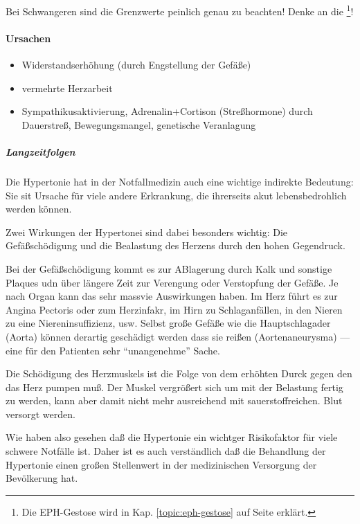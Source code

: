 \begin{gCaveEnv}
    Bei Schwangeren sind die Grenzwerte peinlich genau zu beachten! Denke an
    die \footnote{Die EPH-Gestose wird in
    Kap. \ref{topic:eph-gestose}
    auf Seite \pageref{topic:eph-gestose} erklärt.}!
\end{gCaveEnv}

\paragraph{Ursachen}

\begin{itemize}
    \item Widerstandserh\"ohung (durch Engstellung der Gefä{\ss}e)
    \item vermehrte Herzarbeit
    \item Sympathikusaktivierung, Adrenalin+Cortison (Stre{\ss}hormone) durch
    Dauerstre{\ss},  Bewegungsmangel, genetische Veranlagung  
\end{itemize}

\subparagraph{Langzeitfolgen}

Die Hypertonie hat in der Notfallmedizin auch eine wichtige
indirekte Bedeutung: Sie sit Ursache für viele andere
Erkrankung, die ihrerseits akut lebensbedrohlich werden
können. 

Zwei Wirkungen der Hypertonei sind dabei besonders wichtig:
Die Gefäßschödigung und die Bealastung des Herzens durch
den hohen Gegendruck. 

Bei der Gefäßschödigung kommt es zur ABlagerung durch Kalk
und sonstige Plaques udn über längere Zeit zur Verengung
oder Verstopfung der Gefäße. Je nach Organ kann das sehr
massvie Auswirkungen haben. Im Herz führt es zur Angina
Pectoris oder zum Herzinfakr, im Hirn zu Schlaganfällen, in
den Nieren zu eine Niereninsuffizienz, usw. Selbst große
Gefäße wie die Hauptschlagader (Aorta) können derartig
geschädigt werden dass sie reißen (Aortenaneurysma) --- eine
für den Patienten sehr "`unangenehme"' Sache. 

Die Schödigung des Herzmuskels ist die Folge von dem
erhöhten Durck gegen den das Herz pumpen muß. Der Muskel
vergrößert sich um mit der Belastung fertig zu werden, kann
aber damit nicht mehr ausreichend mit sauerstoffreichen.
Blut versorgt werden. 

Wie haben also gesehen daß die Hypertonie ein wichtger
Risikofaktor für viele schwere Notfälle ist. Daher ist es
auch verständlich daß die Behandlung der Hypertonie einen
großen Stellenwert in der medizinischen Versorgung der
Bevölkerung hat. 

